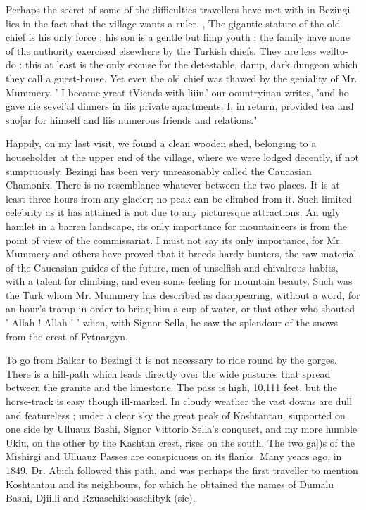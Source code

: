 \documentclass{article}
\begin{document}
	Perhaps the secret of some of the difficulties travellers have met with in Bezingi lies in the fact that the village wants a ruler. , The gigantic stature of the old chief is his only force ; his son is a gentle but limp youth ; the family have none of the authority exercised elsewhere by the Turkish chiefs. They are less wellto- do : this at least is the only excuse for the detestable, damp, dark dungeon which they call a guest-house. Yet even the old chief was thawed by the geniality of Mr. Mummery. ' I became yreat tViends with liiin.' our oountryinan writes, 'and ho gave nie sevei'al dinners in liis private apartments. I, in return, provided tea and suo[ar for himself and liis numerous friends and relations."
	
	Happily, on my last visit, we found a clean wooden shed, belonging to a householder at the upper end of the village, where we were lodged decently, if not sumptuously. Bezingi has been very unreasonably called the Caucasian Chamonix. There is no resemblance whatever between the two places. It is at least three hours from any glacier; no peak can be climbed from it. Such limited celebrity as it has attained is not due to any picturesque attractions. An ugly hamlet in a barren landscape, its only importance for mountaineers is from the point of view of the commissariat. I must not say its only importance, for Mr. Mummery and others have proved that it breeds hardy hunters, the raw material of the Caucasian guides of the future, men of unselfish and chivalrous habits, with a talent for climbing, and even some feeling for mountain beauty. Such was the Turk whom Mr. Mummery has described as disappearing, without a word, for an hour's tramp in order to bring him a cup of water, or that other who shouted ' Allah ! Allah ! ' when, with Signor Sella, he saw the splendour of the snows from the crest of Fytnargyn.
	
	To go from Balkar to Bezingi it is not necessary to ride round by the gorges. There is a hill-path which leads directly over the wide pastures that spread between the granite and the limestone. The pass is high, 10,111 feet, but the horse-track is easy though ill-marked. In cloudy weather the vast downs are dull and featureless ; under a clear sky the great peak of Koshtantau, supported on one side by Ulluauz Bashi, Signor Vittorio Sella's conquest, and my more humble Ukiu, on the other by the Kashtan crest, rises on the south. The two ga])s of the Mishirgi and Ulluauz Passes are conspicuous on its flanks. Many years ago, in 1849, Dr. Abich followed this path, and was perhaps the first traveller to mention Koshtantau and its neighbours, for which he obtained the names of Dumalu Bashi, Djiilli and Rzuaschikibaschibyk (sic). 
	
\end{document}
